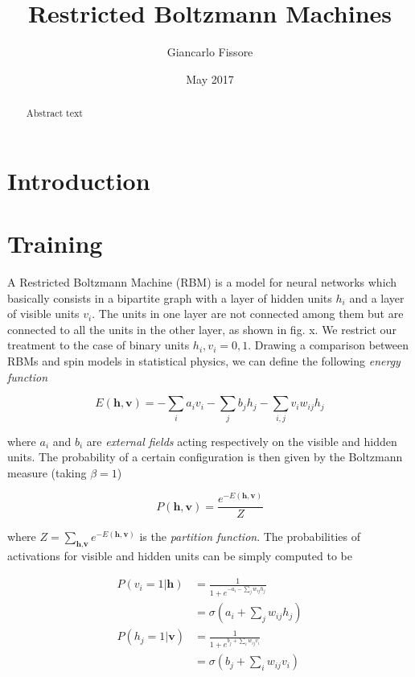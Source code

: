 \documentclass[twocolumn]{article}
\begin{document}
\title{Restricted Boltzmann Machines}
\author{Giancarlo Fissore}
\date{May 2017}
\maketitle

\begin{abstract}
  Abstract text
\end{abstract}

\section{Introduction}

\section{Training}
A Restricted Boltzmann Machine (RBM) is a model for neural networks which basically consists in a bipartite graph with a layer of hidden units \(h_i\) and a layer of visible units \(v_i\). The units in one layer are not connected among them but are connected to all the units in the other layer, as shown in fig. x. We restrict our treatment to the case of binary units \(h_i,v_i = 0,1\). Drawing a comparison between RBMs and spin models in statistical physics, we can define the following \textit{energy function}

\begin{equation}
E(\textbf{h},\textbf{v}) = - \sum_i a_i v_i - \sum_j b_j h_j - \sum_{i,j} v_i w_{ij} h_j
\end{equation}

where \(a_i\) and \(b_i\) are \textit{external fields} acting respectively on the visible and hidden units. The probability of a certain configuration is then given by the Boltzmann measure (taking \(\beta = 1\))

\begin{equation}
P(\textbf{h},\textbf{v}) = \frac{e^{-E(\textbf{h},\textbf{v})}}{Z}
\end{equation}

where \(Z = \sum_{\textbf{h},\textbf{v}} e^{-E(\textbf{h},\textbf{v})}\) is the \textit{partition function}. The probabilities of activations for visible and hidden units can be simply computed to be

\begin{align}
P(v_i = 1 | \textbf{h}) &  = \frac{1}{1+e^{-a_i - \sum_{j} w_{ij} h_j}} \nonumber \\
& = \sigma \left(a_i + \sum_{j} w_{ij} h_j \right) \\
P(h_j = 1 | \textbf{v}) & = \frac{1}{1+e^{b_j + \sum_i w_{ij} v_i}} \nonumber \\
& = \sigma \left(b_j + \sum_i w_{ij} v_i \right)
\end{align}
\end{document}
